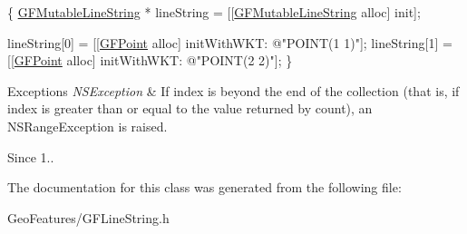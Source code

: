 \begin{DoxyCode}
\{
   \hyperlink{interface_g_f_mutable_line_string}{GFMutableLineString} * lineString = [[\hyperlink{interface_g_f_mutable_line_string}{GFMutableLineString} alloc] 
      init];

   lineString[0] = [[\hyperlink{interface_g_f_point}{GFPoint} alloc] initWithWKT: \textcolor{stringliteral}{@"POINT(1 1)"}];
   lineString[1] = [[\hyperlink{interface_g_f_point}{GFPoint} alloc] initWithWKT: \textcolor{stringliteral}{@"POINT(2 2)"}];
\}
\end{DoxyCode}



\begin{DoxyExceptions}{Exceptions}
{\em N\+S\+Exception} & If index is beyond the end of the collection (that is, if index is greater than or equal to the value returned by count), an N\+S\+Range\+Exception is raised.\\
\hline
\end{DoxyExceptions}
\begin{DoxySince}{Since}
1.. 
\end{DoxySince}


The documentation for this class was generated from the following file\+:\begin{DoxyCompactItemize}
\item 
Geo\+Features/G\+F\+Line\+String.\+h\end{DoxyCompactItemize}
